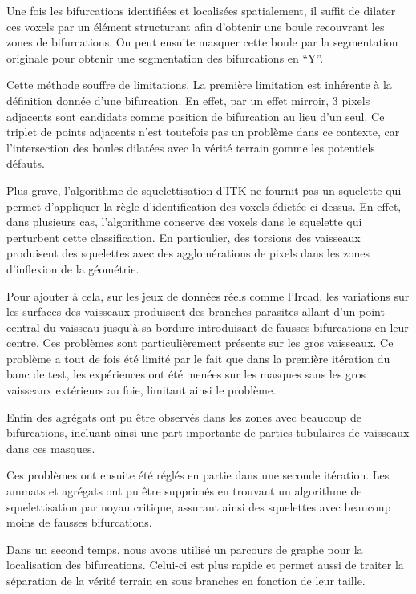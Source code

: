 Une fois les bifurcations identifiées et localisées spatialement, il suffit de dilater ces voxels par un élément structurant afin d'obtenir une boule recouvrant les zones de bifurcations. On peut ensuite masquer cette boule par la segmentation originale pour obtenir une segmentation des bifurcations en ``Y''.

Cette méthode souffre de limitations. La première limitation est inhérente à la définition donnée d'une bifurcation. En effet, par un effet mirroir, 3 pixels adjacents sont candidats comme position de bifurcation au lieu d'un seul. Ce triplet de points adjacents n'est toutefois pas un problème dans ce contexte, car l'intersection des boules dilatées avec la vérité terrain gomme les potentiels défauts.

Plus grave, l'algorithme de squelettisation d'ITK ne fournit pas un squelette qui permet d'appliquer la règle d'identification des voxels édictée ci-dessus. En effet, dans plusieurs cas, l'algorithme conserve des voxels dans le squelette qui perturbent cette classification. En particulier, des torsions des vaisseaux produisent des squelettes avec des agglomérations de pixels dans les zones d'inflexion de la géométrie.

Pour ajouter à cela, sur les jeux de données réels comme l'Ircad, les variations sur les surfaces des vaisseaux produisent des branches parasites allant d'un point central du vaisseau jusqu'à sa bordure introduisant de fausses bifurcations en leur centre. Ces problèmes sont particulièrement présents sur les gros vaisseaux. Ce problème a tout de fois été limité par le fait que dans la première itération du banc de test, les expériences ont été menées sur les masques sans les gros vaisseaux extérieurs au foie, limitant ainsi le problème.

Enfin des agrégats ont pu être observés dans les zones avec beaucoup de bifurcations, incluant ainsi une part importante de parties tubulaires de vaisseaux dans ces masques.

Ces problèmes ont ensuite été réglés en partie dans une seconde itération. Les ammats et agrégats ont pu être supprimés en trouvant un algorithme de squelettisation par noyau critique, assurant ainsi des squelettes avec beaucoup moins de fausses bifurcations.

Dans un second temps, nous avons utilisé un parcours de graphe pour la localisation des bifurcations. Celui-ci est plus rapide et permet aussi de traiter la séparation de la vérité terrain en sous branches en fonction de leur taille.

